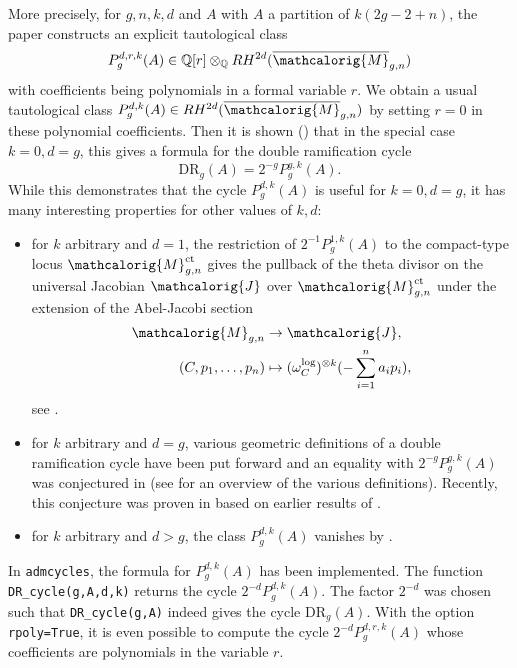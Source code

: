 \documentclass[11pt]{article}
\newcommand{\M}{\ensuremath{\overline{\mathcalorig{M}}}}
\newcommand{\DR}{\mathrm{DR}}
\begin{document}
More precisely, for $g,n,k,d$ and $A$ with $A$ a partition of $k(2g-2+n)$, the paper constructs an explicit tautological class
\[P_g^{d,r,k}(A) \in \mathbb{Q}[r] \otimes_{\mathbb{Q}} RH^{2d}(\M_{g,n})\]
with coefficients being polynomials in a formal variable $r$. We obtain a usual tautological class $P_g^{d,k}(A) \in RH^{2d}(\M_{g,n})$ by setting $r=0$ in these polynomial coefficients. Then it is shown (\cite[Theorem 1]{Janda2016Double-ramifica}) that in the special case $k=0,d=g$, this gives a formula for the double ramification cycle
\[\DR_g(A) = 2^{-g} P_g^{g,k}(A).\]
While this demonstrates that the cycle $P_g^{d,k}(A)$ is useful for $k=0, d=g$, it has many interesting properties for other values of $k,d$:
\begin{itemize}
    \item for $k$ arbitrary and $d=1$, the restriction of $2^{-1} P_g^{1,k}(A)$ to the compact-type locus $\mathcalorig{M}_{g,n}^\textup{ct}$ gives the pullback of the theta divisor on the universal Jacobian $\mathcalorig{J}$ over $\mathcalorig{M}_{g,n}^\textup{ct}$ under the extension of the Abel-Jacobi section
    \begin{align*}\mathcalorig{M}_{g,n} &\to \mathcalorig{J},\\ (C,p_1, \ldots, p_n) &\mapsto (\omega_C^\textup{log})^{\otimes k}(- \sum_{i=1}^n a_i p_i),\end{align*}
    see \cite{Hain2013Normal-function, Grushevsky2012The-zero-sectio}.
    \item for $k$ arbitrary and $d=g$, various geometric definitions of a double ramification cycle have been put forward and an equality with $2^{-g} P_g^{g,k}(A)$ was conjectured in \cite{FP, SchmittDimension}
    (see \cite[Section 1.6]{pluricanonical} for an overview of the various definitions).  Recently, this conjecture was proven in \cite{bhpss} based on earlier results of \cite{pluricanonical}. %
    \item for $k$ arbitrary and $d>g$, the class $P_g^{d,k}(A)$ vanishes by \cite{claderjanda}.
\end{itemize}
In \texttt{admcycles}, the formula for $P_g^{d,k}(A)$ has been implemented. The function \verb|DR_cycle(g,A,d,k)| returns the cycle $2^{-d} P_g^{d,k}(A)$. The factor $2^{-d}$ was chosen such that \verb|DR_cycle(g,A)| indeed gives the cycle $\DR_g(A)$. With the option \texttt{rpoly=True}, it is even possible to compute the cycle $2^{-d} P_g^{d,r,k}(A)$ whose coefficients are polynomials in the variable $r$.
\end{document}
